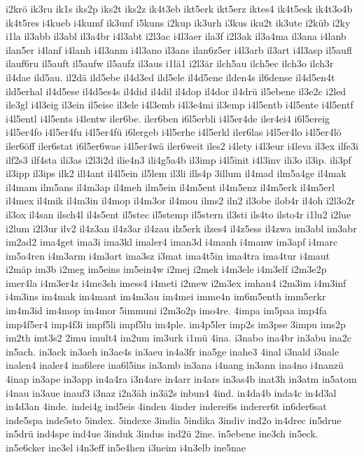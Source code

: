{i2krö
ik3ru
ik1s
iks2p
iks2t
iks2z
ik4t3eb
ikt5erk
ikt5erz
iktes4
ik4t5esk
ik4t3o4b
ik4t5res
i4kueb
i4kumf
ik3unf
i5kuns
i2kup
ik3urh
i3kus
iku2t
ik3ute
i2küb
i2ky
i1la
il3abb
il3abl
il3a4br
i4l3abt
i2l3ac
i4l3aer
ila3f
i2l3ak
il3a4ma
il3ana
i4lanb
ilan5er
i4lanf
i4lanh
i4l3anm
i4l3ano
il3ans
ilan6z5er
i4l3arb
il3art
i4l3asp
il5aufl
ilauf6ru
il5auft
il5aufw
il5aufz
il3aus
i1lä1
i2l3är
ilch5au
ilch5ec
ilch3o
ilch3r
il4dae
ild5au.
il2dä
ild5ebe
il4d3ed
ild5ele
il4d5ene
ilden4s
il6dense
il4d5en4t
ild5erhal
il4d5ese
il4d5es4s
il4did
il4dil
il4dop
il4dor
il4drü
il5ebene
il3e2c
i2led
ile3gl
i4l3eig
il3ein
il5eise
il3ele
i4l3emb
i4l3e4mi
il3emp
i4l5entb
i4l5ente
i4l5entf
i4l5entl
i4l5ents
i4lentw
iler6be.
iler6ben
i6l5erbli
i4l5er4de
iler4ei4
i6l5ereig
i4l5er4fo
i4l5er4fu
i4l5er4fü
i6lergeb
i4l5erhe
i4l5erkl
iler6las
i4l5er4lo
i4l5er4lö
iler6öff
iler6stat
i6l5er6wae
i4l5er4wä
iler6weit
iles2
i4lety
i4l3eur
i4leva
il3ex
ilfe3i
ilf2s3
ilf4sta
ili3as
i2l3i2d
ilie4n3
ili4g5a4b
il3imp
i4l5init
i4l3inv
ili3o
il3ip.
ili3pf
il3ipp
il3ips
ilk2
ill4ant
il4l5ein
il5lem
il3li
ills4p
3illum
il4mad
ilm5a4ge
il4mak
il4mam
ilm5ans
il4m3ap
il4meh
ilm5ein
il4m5ent
il4m5enz
il4m5erk
il4m5erl
il4mex
il4mik
il4m3in
il4mop
il4m3or
il4mou
ilms2
iln2
il3obe
ilob4r
il4oh
i2l3o2r
il3ox
il4san
ilsch4l
il4s5ent
il5stec
il5stemp
il5stern
il3sti
ils4to
ilsto4r
i1lu2
i2lue
i2lum
i2l3ur
ilv2
il4z3an
il4z3ar
il4zau
ilz5erk
ilzes4
il4z5ess
il4zwa
im3abl
im3abr
im2ad2
ima4get
ima3i
ima3kl
imaler4
iman3d
i4manh
i4manw
im3apf
i4marc
im5a4ren
i4m3arm
i4m3art
ima3sz
i3mat
ima4t5in
ima4tra
ima4tur
i4maut
i2mäp
im3b
i2meg
im5eins
im5ein4w
i2mej
i2mek
i4m3ele
i4m3elf
i2m3e2p
imer4la
i4m3er4z
i4me3sh
imess4
i4meti
i2mew
i2m3ex
imhau4
i2m3im
i4m3inf
i4m3ins
im4mak
im4mant
im4m3au
im4mei
imme4n
im6m5enth
imm5erkr
im4m3id
im4mop
im4mor
5immuni
i2m3o2p
imo4re.
4impa
im5paa
imp4fa
imp4f5er4
imp4f3i
impf5li
impf5lu
im4ple.
im4p5ler
imp2s
im3pse
3impu
ims2p
im2th
imt3s2
2imu
imult4
im2um
im3urk
i1mü
4ina.
i3nabo
ina4br
in3abu
ina2c
in5ach.
in3ack
in3aeh
in3ae4s
in3aeu
in4a3fr
ina5ge
inahe3
4inal
i3nald
i3nale
inalen4
inaler4
ina6lere
ina6l5ins
in3amb
in3ana
i4nang
in3ann
ina4no
i4nanzü
4inap
in3ape
in3app
in4a4ra
i3n4are
in4arr
in4ars
in3as4b
inat3h
in3atm
in5atom
i4nau
in3aue
inauf3
i3naz
i2n3äh
in3ä2s
inbun4
4ind.
in4da4b
inda4c
in4d3al
in4d3an
4inde.
indei4g
ind5eis
4inden
4inder
inderei6s
inderer6t
in6der6sat
inde5spa
inde5sto
5index.
5indexe
3india
5indika
3indiv
ind2o
in4drec
in5drue
in5drü
ind4spe
ind4ue
3induk
3indus
ind2ü
2ine.
in5ebene
ine3ch
in5eck.
in5e6cker
ine3el
i4n3eff
in5e4hen
i3neim
i4n3elb
ine5nae
}
